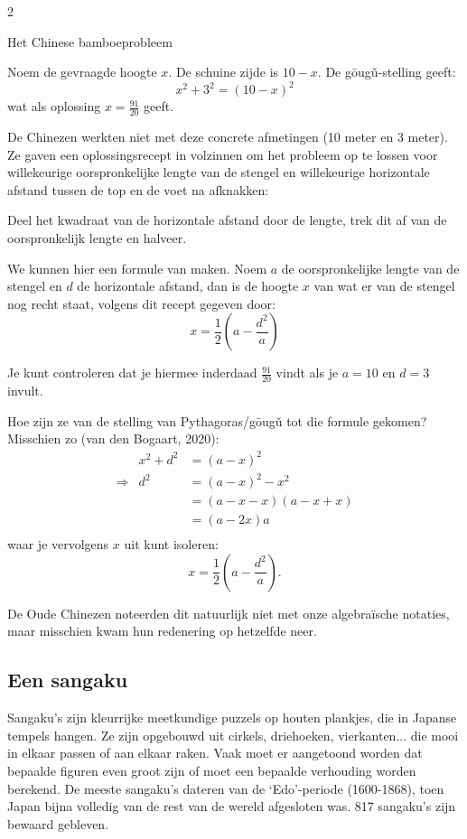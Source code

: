 \begin{multicols}{2}
\begin{kader}{Het Chinese bamboeprobleem}{}
\end{kader}

Noem de gevraagde hoogte $x$. De schuine zijde is $10-x$. De gōugǔ-stelling geeft:
\[x^2+3^2=(10-x)^2\]
wat als oplossing \(x=\frac{91}{20}\) geeft.

De Chinezen werkten niet met deze concrete afmetingen (10 meter en 3 meter). Ze gaven een oplossingsrecept in volzinnen om het probleem op te lossen voor willekeurige oorspronkelijke lengte van de stengel en willekeurige horizontale afstand tussen de top en de voet na afknakken: 
\begin{citaat}
    Deel het kwadraat van de horizontale afstand door de lengte, trek dit af van de oorspronkelijk lengte en halveer. 
\end{citaat}
We kunnen hier een formule van maken. Noem $a$ de oorspronkelijke lengte van de stengel en $d$ de horizontale afstand, dan is de hoogte $x$ van wat er van de stengel nog recht staat, volgens dit recept gegeven door:
\[x=\frac{1}{2}\left(a-\frac{d^2}{a}\right)\]

Je kunt controleren dat je hiermee inderdaad $\frac{91}{20}$ vindt als je $a=10$ en $d=3$ invult.

Hoe zijn ze van de stelling van Pythagoras/gōugǔ tot die formule gekomen? Misschien zo (van den Bogaart, 2020):
\[
\begin{array}{lrl}
    &x^2+d^2 &=(a-x)^2 \\
    \Rightarrow &d^2&=(a-x)^2-x^2  \\
    & &=(a-x-x)(a-x+x)\\
    & &=(a-2x)a\\
\end{array}
\]
waar je vervolgens \(x\) uit kunt isoleren:
\[ x =\frac{1}{2}\left(a-\frac{d^2}{a}\right).\]

De Oude Chinezen noteerden dit natuurlijk niet met onze \mbox{algebraïsche} notaties, maar misschien kwam hun redenering op hetzelfde neer.

\subsection*{Een sangaku}

Sangaku's zijn kleurrijke meetkundige puzzels op houten plankjes, die in Japanse tempels hangen. Ze zijn opgebouwd uit cirkels, driehoeken, vierkanten... die mooi in elkaar passen of aan elkaar raken. Vaak moet er aangetoond worden dat bepaalde figuren even groot zijn of moet een bepaalde verhouding worden berekend. De meeste sangaku’s dateren van de ‘Edo’-periode (1600-1868), toen Japan bijna volledig van de rest van
de wereld afgesloten was. 817 sangaku’s zijn bewaard gebleven.


\end{multicols}
